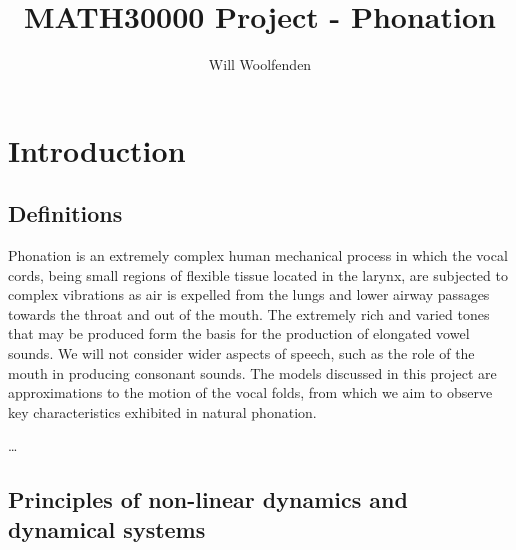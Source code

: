 \documentclass{book}
\title{MATH30000 Project - Phonation}
\author{Will Woolfenden}
\begin{document}
\maketitle

\chapter{Introduction}

\section{Definitions}

Phonation is an extremely complex human mechanical process in which the vocal cords, being small regions of flexible tissue located in the larynx,
are subjected to complex vibrations as air is expelled from the lungs and lower airway passages towards the throat and out of the mouth.
The extremely rich and varied tones that may be produced  form the basis for the production of elongated vowel sounds.
We will not consider wider aspects of speech, such as the role of the mouth in producing consonant sounds.
The models discussed in this project are approximations to the motion of the vocal folds,
from which we aim to observe key characteristics exhibited in natural phonation.


\dots

\section{Principles of non-linear dynamics and dynamical systems}
\end{document}
